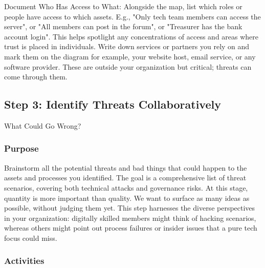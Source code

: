 Document Who Has Access to What: Alongside the map, list which roles or people have
access to which assets. E.g., "Only tech team members can access the server", or "All
members can post in the forum", or "Treasurer has the bank account login". This
helps spotlight any concentrations of access and areas where trust is placed in
individuals. Write down services or partners you rely on and mark them on the
diagram for example, your website host, email service, or any software
provider. These are outside your organization but critical; threats can come through them.

\subsection{Step 3: Identify Threats Collaboratively}
\label{subsec:Step3}

What Could Go Wrong?

\subsubsection{Purpose}

Brainstorm all the potential threats and bad things that could happen to the
assets and processes you identified. The goal is a comprehensive list of threat
scenarios, covering both technical attacks and governance risks. At this
stage, quantity is more important than quality. We want to surface as many
ideas as possible, without judging them yet. This step harnesses the diverse
perspectives in your organization: digitally skilled members might think
of hacking scenarios, whereas others might point out process failures or insider
issues that a pure tech focus could miss.

\subsubsection{Activities}

